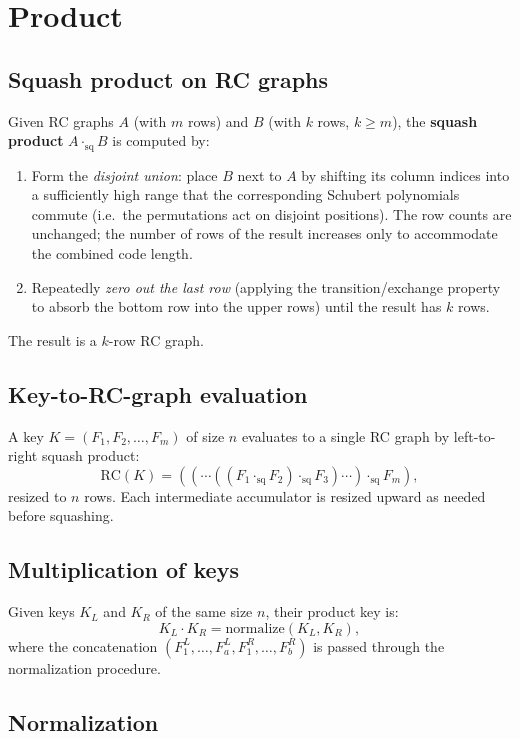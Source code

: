 \documentclass[11pt]{article}
\newcommand{\RC}{\mathrm{RC}}
\theoremstyle{definition}
\begin{document}
\section{Product}

\subsection{Squash product on RC graphs}

Given RC graphs $A$ (with $m$ rows) and $B$ (with $k$ rows, $k \geq m$), the \textbf{squash product} $A \cdot_{\mathrm{sq}} B$ is computed by:
\begin{enumerate}
  \item Form the \emph{disjoint union}: place $B$ next to $A$ by shifting its column indices into a sufficiently high range that the corresponding Schubert polynomials commute (i.e.\ the permutations act on disjoint positions).  The row counts are unchanged; the number of rows of the result increases only to accommodate the combined code length.
  \item Repeatedly \emph{zero out the last row} (applying the transition/exchange property to absorb the bottom row into the upper rows) until the result has $k$ rows.
\end{enumerate}
The result is a $k$-row RC graph.

\subsection{Key-to-RC-graph evaluation}

A key $K = (F_1, F_2, \ldots, F_m)$ of size $n$ evaluates to a single RC graph by left-to-right squash product:
\[
  \RC(K) = ((\cdots((F_1 \cdot_{\mathrm{sq}} F_2) \cdot_{\mathrm{sq}} F_3) \cdots) \cdot_{\mathrm{sq}} F_m),
\]
resized to $n$ rows.  Each intermediate accumulator is resized upward as needed before squashing.

\subsection{Multiplication of keys}

Given keys $K_L$ and $K_R$ of the same size $n$, their product key is:
\[
  K_L \cdot K_R = \mathrm{normalize}(K_L, K_R),
\]
where the concatenation $(F_1^L, \ldots, F_a^L, F_1^R, \ldots, F_b^R)$ is passed through the normalization procedure.

\subsection{Normalization}
\end{document}
